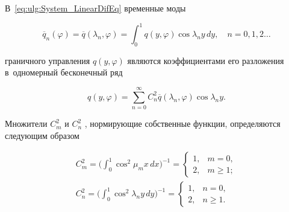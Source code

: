 В~\eqref{eq:ulg:System_LinearDifEq} временные моды

\begin{equation}\label{eq:ulg:Mody_Control}

{\overline q _n}(\varphi ) = \overline q (\lambda _n,\varphi ) = \int _0^1 {q(y,\varphi )} \cos \lambda_n y\,dy,\quad n = 0, 1, 2\dots

\end{equation}

граничного управления  $q(y,\varphi)$ являются коэффициентами его разложения в~одномерный бесконечный ряд

\begin{equation}\label{eq:ulg:Infinite_Serial_Control}

q(y,\varphi ) = \sum\limits_{n = 0}^\infty  {C_n^2\overline q (\lambda _n,\varphi )} \cos {\lambda _n}y.

\end{equation}



Множители $C_m^2$  и  $C_n^2$ , нормирующие собственные функции, определяются следующим образом

\begin{gather}

\label{eq:ulg:NormirCoefficients_x}

C_m^2 = \biggl( \int _0^1 \cos ^2 \mu_mx \, dx  \biggr)^{ - 1} = \left\{ \begin{array}{cc}

1,&m = 0,\\

2,&m \ge 1;

\end{array} \right.

\\

\label{eq:ulg:NormirCoefficients_y}

C_n^2 = \biggl( \int _0^1 \cos ^2 \lambda_ny\,dy  \biggr)^{ - 1} = \left\{ \begin{array}{cc}

1,&n = 0,\\

2,&n \ge 1.

\end{array} \right.

\end{gather}




